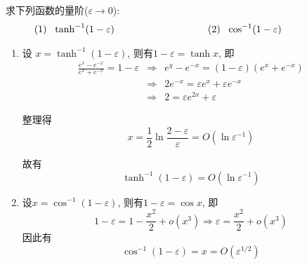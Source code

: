 \begin{problem}[习题1.2]
求下列函数的量阶($\varepsilon\rightarrow 0$):
\[
\begin{array}{lll}
    \displaystyle (1)~~\tanh^{-1}(1-\varepsilon)\hspace{2.5em} &\hspace{5em}&   \displaystyle (2)~~\cos^{-1}(1-\varepsilon)\hspace{5em} \\
\end{array}
\]
\end{problem}

\begin{solution}
\begin{enumerate}
\item 设 $x = \tanh^{-1}(1-\varepsilon)$, 则有$1-\varepsilon=\tanh x$, 即
\begin{eqnarray}
\frac{e^x-e^{-x}}{e^x+e^{-x}} = 1-\varepsilon & \Longrightarrow & e^y-e^{-x} = (1-\varepsilon)(e^x+e^{-x})\nonumber\\
 & \Longrightarrow & 2e^{-x} = \varepsilon e^x + \varepsilon e^{-x}\nonumber\\
 & \Longrightarrow & 2 = \varepsilon e^{2x} + \varepsilon
\nonumber
\end{eqnarray}

整理得
\[
x = \frac{1}{2}\ln\frac{2-\varepsilon}{\varepsilon} = O(\ln\varepsilon^{-1})
\]

故有
\[
\tanh^{-1}(1-\varepsilon) = O(\ln\varepsilon^{-1})
\]

\item 设$x = \cos^{-1}(1-\varepsilon)$, 则有$1-\varepsilon = \cos x$, 即
\[
1-\varepsilon = 1-\frac{x^2}{2} +o(x^3) \Longrightarrow \varepsilon = \frac{x^2}{2} +o(x^3)
\]
因此有
\[
\cos^{-1}(1-\varepsilon) = x = O(\varepsilon^{1/2})
\]
\end{enumerate}
\end{solution} 
